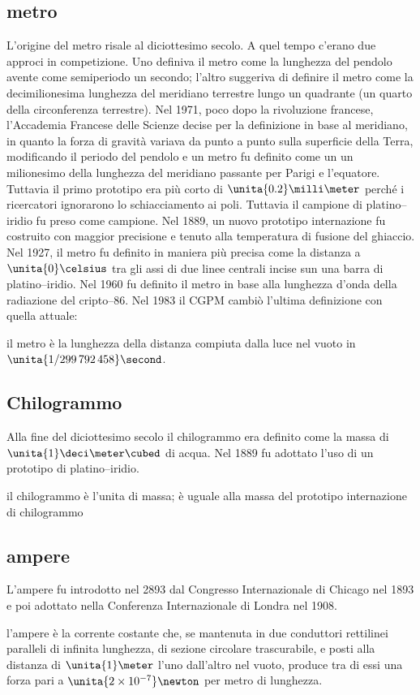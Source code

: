 \subsection{metro}
L'origine del metro risale al diciottesimo secolo. A quel tempo c'erano due approci in competizione. Uno definiva il metro come la lunghezza del pendolo avente come semiperiodo un secondo; l'altro suggeriva di definire il metro come la decimilionesima lunghezza del meridiano terrestre lungo un quadrante (un quarto della circonferenza terrestre). Nel 1971, poco dopo la rivoluzione francese, l'Accademia Francese delle Scienze decise per la definizione in base al meridiano, in quanto la forza di gravità variava da punto a punto sulla superficie della Terra, modificando il periodo del pendolo e un metro fu definito come un un milionesimo della lunghezza del meridiano passante per Parigi e l'equatore. Tuttavia il primo prototipo era più corto di $\unita{0.2}\milli\meter$ perché i ricercatori ignorarono lo schiacciamento ai poli. Tuttavia il campione di platino--iridio fu preso come campione. Nel 1889, un nuovo prototipo internazione fu costruito con maggior precisione e tenuto alla temperatura di fusione del ghiaccio. Nel 1927, il metro fu definito in maniera più precisa come la distanza a $\unita{0}\celsius$ tra gli assi di due linee centrali incise sun una barra di platino--iridio. Nel 1960 fu definito il metro in base alla lunghezza d'onda della radiazione del cripto--86. Nel 1983 il CGPM cambiò l'ultima definizione con quella attuale:
\begin{definizioneunita}
il metro è la lunghezza della distanza compiuta dalla luce nel vuoto in  $\unita{1/299\,792\,458}\second$.
\end{definizioneunita}
\subsection{Chilogrammo}
Alla fine del diciottesimo secolo il chilogrammo era definito come la massa di $\unita{1}\deci\meter\cubed$ di acqua. Nel 1889 fu adottato l'uso di un prototipo di platino--iridio.
\begin{definizioneunita}
il chilogrammo è l'unita di massa; è uguale alla massa del prototipo internazione di chilogrammo
\end{definizioneunita}
\subsection{ampere}
L'ampere fu introdotto nel 2893 dal Congresso Internazionale di Chicago nel 1893 e poi adottato nella Conferenza Internazionale di Londra nel 1908.
\begin{definizioneunita}
l'ampere è la corrente costante che, se mantenuta in due conduttori rettilinei paralleli di infinita lunghezza, di sezione circolare trascurabile, e posti alla distanza di $\unita{1}\meter$ l'uno dall'altro nel vuoto, produce tra di essi una forza pari a $\unita{2\times 10^{-7}}\newton$ per metro di lunghezza.
\end{definizioneunita}

